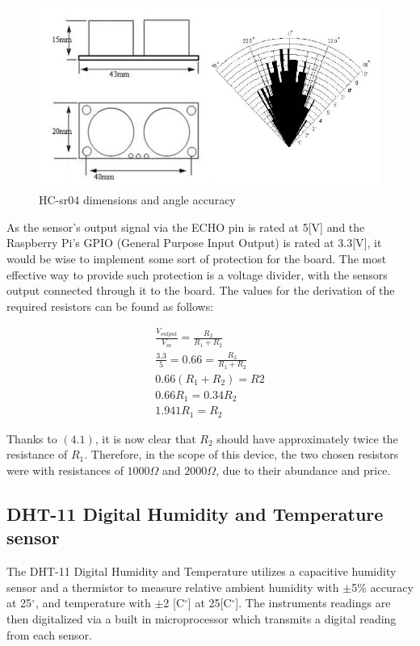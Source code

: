 \documentclass[twoside]{ctuthesis}
\theoremstyle{plain}
\theoremstyle{definition}
\theoremstyle{note}
\begin{document}
\begin{figure}[H]
	\centering
	\includegraphics[scale=0.5]{HCSR04_sizes}
	\caption{HC-sr04 dimensions and angle accuracy \cite{HC-SR04}}
\end{figure}

As the sensor's output signal via the ECHO pin is rated at 5[V] \cite{HC-SR04} and the Raspberry Pi's GPIO (General Purpose Input Output) is rated at 3.3[V]\cite{RasPi0W}, it would be wise to implement some sort of protection for the board. The most effective way to provide such protection is a voltage divider, with the sensors output connected through it to the board. The values for the derivation of the required resistors can be found as follows:

\begin{gather}\nonumber
	\frac{V_{output}}{V_{in}} = \frac{R_2}{R_1 + R_2}\\\nonumber
	\frac{3.3}{5}= 0.66 = \frac{R_2}{R_1 + R_2}\\\nonumber
	0.66(R_1+R_2) = R2\\\nonumber
	0.66R_1 = 0.34R_2\\
	1.941R_1 = R_2
\end{gather}

Thanks to $(4.1)$, it is now clear that $R_2$ should have approximately twice the resistance of $R_1$. Therefore, in the scope of this device, the two chosen resistors were with resistances of $1000\Omega$ and $2000\Omega$, due to their abundance and price.


\subsection{DHT-11 Digital Humidity and Temperature sensor}
The DHT-11 Digital Humidity and Temperature utilizes a capacitive humidity sensor and a thermistor to measure relative ambient humidity with $\pm$5$\%$ accuracy at 25$^\circ$, and temperature with $\pm$2 [C$^\circ$] at 25[C$^\circ$]. The instruments readings are then digitalized via a built in microprocessor which transmits a digital reading from each sensor.
\end{document}
